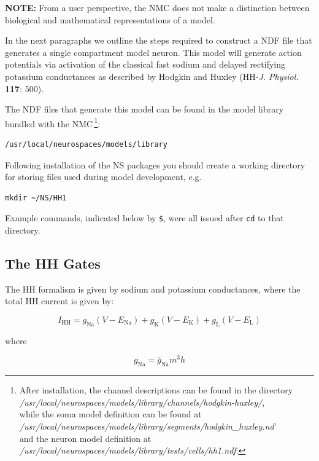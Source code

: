 \documentclass[12pt]{article}
\begin{document}
{\bf NOTE:} From a user perspective, the NMC does not make a distinction between
biological and mathematical representations of a model.  

In the next paragraphs we outline the steps required to construct a
NDF file that generates a single compartment model neuron.  This model
will generate action potentials via activation of the
classical fast sodium and delayed rectifying potassium conductances as
described by Hodgkin and Huxley (HH-{\it J. Physiol.} {\bf 117}: 500).

The NDF files that generate this model can be found in the model
library bundled with the NMC\,\footnote{After installation, the channel descriptions can be found in the directory\\
  {\it /usr/local/neurospaces/models/library/channels/hodgkin-huxley/},\\
  while the soma model definition can be found at\\
  {\it /usr/local/neurospaces/models/library/segments/hodgkin\_huxley.nd}'\\
  and the neuron model definition at\\
  {\it /usr/local/neurospaces/models/library/tests/cells/hh1.ndf}.}:
\begin{verbatim}
/usr/local/neurospaces/models/library
\end{verbatim}

Following installation of the NS packages you should create a working
directory for storing files used during model development, e.g.
\begin{verbatim}
mkdir ~/NS/HH1
\end{verbatim}
Example commands, indicated below by {\tt \$},
were all issued after {\tt cd} to that directory.

\subsection{The HH Gates}

The HH formalism is given by sodium and potassium conductances, where
the total HH current is given by:

\begin{equation}
  \label{eq:hodgkin-huxley-current}
  I_{\mathrm{HH}} = g_{\mathrm{Na}} (V-E_{\mathrm{Na}})
  + g_{\mathrm{K}} (V-E_{\mathrm{K}}) +
  g_{\mathrm{L}}(V-E_{\mathrm{L}})
\end{equation}

where

\begin{equation}
  \label{eq:g-na}
  g_{\mathrm{Na}} = \overline{g}_{\mathrm{Na}}m^3h
\end{equation}
\end{document}
